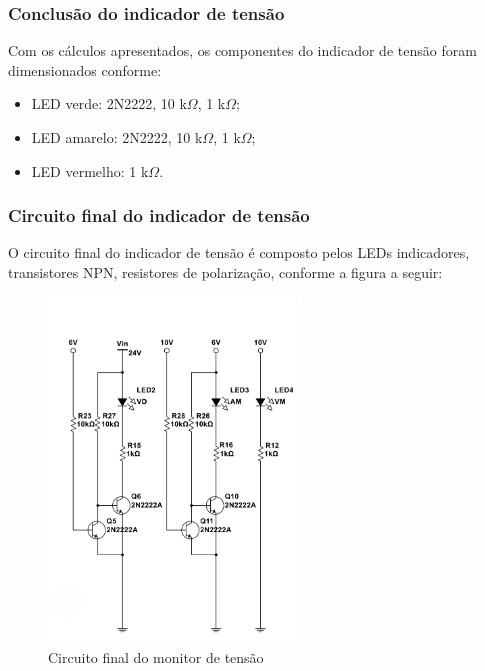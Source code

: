 \subsubsection*{Conclusão do indicador de tensão}

Com os cálculos apresentados, os componentes do indicador de tensão foram dimensionados conforme:

\begin{itemize}
    \item LED verde: 2N2222, 10 k\(\Omega\), 1 k\(\Omega\);
    \item LED amarelo: 2N2222, 10 k\(\Omega\), 1 k\(\Omega\);
    \item LED vermelho: 1 k\(\Omega\).
\end{itemize}

\subsubsection*{Circuito final do indicador de tensão}

O circuito final do indicador de tensão é composto pelos LEDs indicadores, transistores NPN, resistores de polarização, conforme a figura a seguir:

\begin{figure}[H]
    \centering
    \includegraphics[width=0.6\textwidth]{../imagens/circuito_indicador.png}
    \caption{Circuito final do monitor de tensão}
    \label{fig:indicador_tensao}
\end{figure}

